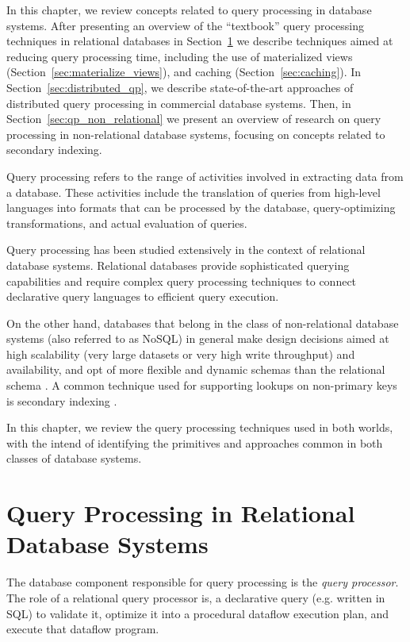 In this chapter, we review concepts related to query processing in database systems.
After presenting an overview of the ``textbook'' query processing techniques in relational databases in Section~\ref{sec:query_pr_relational}
we describe techniques aimed at reducing query processing time, including the use of materialized views (Section~\ref{sec:materialize_views}),
and caching (Section~\ref{sec:caching}).
In Section~\ref{sec:distributed_qp}, we describe state-of-the-art approaches of distributed query processing in commercial database systems.
Then, in Section~\ref{sec:qp_non_relational} we present an overview of research on query processing in non-relational database systems,
focusing on concepts related to secondary indexing.

Query processing refers to the range of activities involved in extracting data from a database.
These activities include the translation of queries from high-level languages into formats that can be processed
by the database, query-optimizing transformations, and actual evaluation of queries.

Query processing has been studied extensively in the context of relational database systems.
Relational databases provide sophisticated querying capabilities and require complex query processing techniques
to connect declarative query languages to efficient query execution.

On the other hand, databases that belong in the class of non-relational database systems (also referred to as NoSQL)
in general make design decisions aimed at high scalability (very large datasets or very high write throughput) and availability,
and opt of more flexible and dynamic schemas than the relational schema \cite{couchbase:nosqladoption}.
A common technique used for supporting lookups on non-primary keys is secondary indexing \cite{riakv:secondaryindexes, cassandra:secondaryindexing}.

In this chapter, we review the query processing techniques used in both worlds,
with the intend of identifying the primitives and approaches common in both classes of database systems.

\section{Query Processing in Relational Database Systems}
\label{sec:query_pr_relational}
The database component responsible for query processing is the \textit{query processor}.
The role of a relational query processor is, a declarative query (e.g. written in SQL) to validate it,
optimize it into a procedural dataflow execution plan, and execute that dataflow program.

